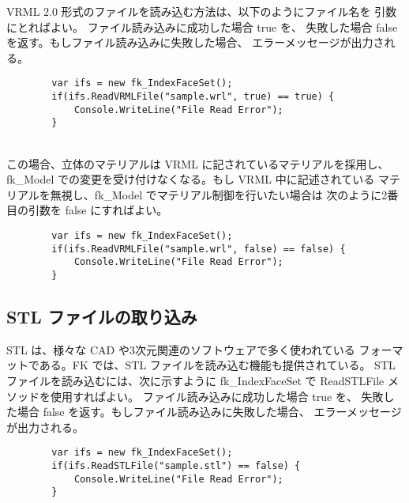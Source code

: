 VRML 2.0 形式のファイルを読み込む方法は、以下のようにファイル名を
引数にとればよい。
ファイル読み込みに成功した場合 true を、
失敗した場合 false を返す。もしファイル読み込みに失敗した場合、
エラーメッセージが出力される。
\\
\begin{screen}
\begin{verbatim}
        var ifs = new fk_IndexFaceSet();
        if(ifs.ReadVRMLFile("sample.wrl", true) == true) {
            Console.WriteLine("File Read Error");
        }
\end{verbatim}
\end{screen}
~ \\
この場合、立体のマテリアルは VRML に記されているマテリアルを採用し、
fk\_Model での変更を受け付けなくなる。もし VRML 中に記述されている
マテリアルを無視し、fk\_Model でマテリアル制御を行いたい場合は
次のように2番目の引数を false にすればよい。
\\
\begin{screen}
\begin{verbatim}
        var ifs = new fk_IndexFaceSet();
        if(ifs.ReadVRMLFile("sample.wrl", false) == false) {
            Console.WriteLine("File Read Error");
        }
\end{verbatim}
\end{screen}

\subsection{STL ファイルの取り込み}
STL は、様々な CAD や3次元関連のソフトウェアで多く使われている
フォーマットである。FK では、STL ファイルを読み込む機能も提供されている。
STL ファイルを読み込むには、次に示すように fk\_IndexFaceSet で
ReadSTLFile メソッドを使用すればよい。
ファイル読み込みに成功した場合 true を、
失敗した場合 false を返す。もしファイル読み込みに失敗した場合、
エラーメッセージが出力される。
\\
\begin{screen}
\begin{verbatim}
        var ifs = new fk_IndexFaceSet();
        if(ifs.ReadSTLFile("sample.stl") == false) {
            Console.WriteLine("File Read Error");
        }
\end{verbatim}
\end{screen}

